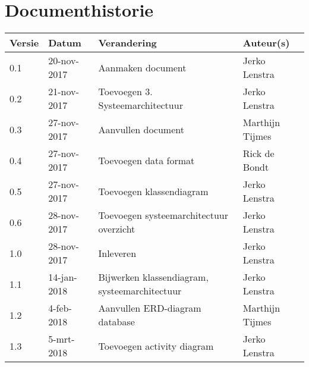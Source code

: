 \section{Documenthistorie}

\begin{tabularx}{\textwidth}{| l | l | X | l |}
	\hline
	\textbf{Versie} & \textbf{Datum} & \textbf{Verandering} & \textbf{Auteur(s)} \\ \hline
	0.1	& 20-nov-2017 & Aanmaken document & Jerko Lenstra \\ \hline
    0.2 & 21-nov-2017 & Toevoegen 3. Systeemarchitectuur & Jerko Lenstra \\ \hline
    0.3 & 27-nov-2017 & Aanvullen document & Marthijn Tijmes \\ \hline
    0.4 & 27-nov-2017 & Toevoegen data format & Rick de Bondt \\ \hline
    0.5 & 27-nov-2017 & Toevoegen klassendiagram & Jerko Lenstra \\ \hline
    0.6 & 28-nov-2017 & Toevoegen systeemarchitectuur overzicht & Jerko Lenstra \\ \hline
    1.0 & 28-nov-2017 & Inleveren & Jerko Lenstra \\ \hline
    1.1 & 14-jan-2018 & Bijwerken klassendiagram, systeemarchitectuur & Jerko Lenstra \\ \hline
    1.2 & 4-feb-2018 & Aanvullen ERD-diagram database & Marthijn Tijmes \\ \hline
    1.3 & 5-mrt-2018 & Toevoegen activity diagram & Jerko Lenstra \\ \hline

\end{tabularx}

